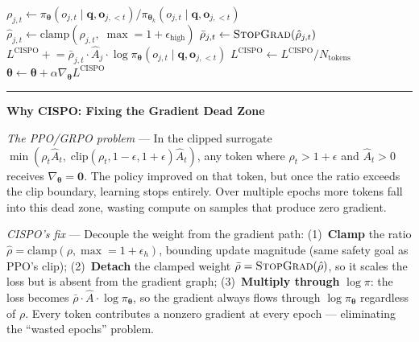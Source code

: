 \documentclass[11pt]{article}
\begin{document}
\begin{algorithm}[p]
\begin{minipage}[t]{0.68\linewidth}
\begin{algorithmic}[1]
                    \State $\rho_{j,t} \gets \pi_{\boldsymbol{\theta}}(o_{j,t} \mid \mathbf{q}, \mathbf{o}_{j,<t}) / \pi_{\boldsymbol{\theta}_k}(o_{j,t} \mid \mathbf{q}, \mathbf{o}_{j,<t})$
                    \State $\hat{\rho}_{j,t} \gets \text{clamp}(\rho_{j,t},\; \max = 1 + \epsilon_{\text{high}})$
                    \State $\bar{\rho}_{j,t} \gets \textsc{StopGrad}(\hat{\rho}_{j,t})$
                    \State $L^{\text{CISPO}} \mathrel{+}= \bar{\rho}_{j,t} \cdot \hat{A}_j \cdot \log \pi_{\boldsymbol{\theta}}(o_{j,t} \mid \mathbf{q}, \mathbf{o}_{j,<t})$
                \EndFor
            \EndFor
            \State $L^{\text{CISPO}} \gets L^{\text{CISPO}} / N_{\text{tokens}}$
            \State $\boldsymbol{\theta} \gets \boldsymbol{\theta} + \alpha \nabla_{\boldsymbol{\theta}} L^{\text{CISPO}}$
        \EndFor
    \EndFor
\EndFor
\end{algorithmic}
\end{minipage}
\vspace{6pt}
\noindent\rule{\linewidth}{0.4pt}
\vspace{4pt}
\noindent\textbf{Why CISPO: Fixing the Gradient Dead Zone}

\smallskip\noindent
\textit{The PPO/GRPO problem} --- In the clipped surrogate
$\min(\rho_t \hat{A}_t,\; \text{clip}(\rho_t, 1{-}\epsilon, 1{+}\epsilon)\hat{A}_t)$,
any token where $\rho_t > 1{+}\epsilon$ and $\hat{A}_t > 0$ receives
$\nabla_{\boldsymbol{\theta}} = \mathbf{0}$.
The policy improved on that token, but once the ratio exceeds the clip boundary,
learning stops entirely. Over multiple epochs more tokens fall into this dead zone,
wasting compute on samples that produce zero gradient.

\smallskip\noindent
\textit{CISPO's fix} --- Decouple the weight from the gradient path:
(1)~\textbf{Clamp} the ratio $\hat{\rho} = \text{clamp}(\rho, \max\!=\!1{+}\epsilon_h)$, bounding update magnitude (same safety goal as PPO's clip);
(2)~\textbf{Detach} the clamped weight $\bar{\rho} = \textsc{StopGrad}(\hat{\rho})$, so it scales the loss but is absent from the gradient graph;
(3)~\textbf{Multiply through} $\log\pi$: the loss becomes $\bar{\rho} \cdot \hat{A} \cdot \log\pi_{\boldsymbol{\theta}}$, so the gradient always flows through $\log\pi_{\boldsymbol{\theta}}$ regardless of $\rho$.
Every token contributes a nonzero gradient at every epoch --- eliminating the ``wasted epochs'' problem.
\end{algorithm}
\end{document}
